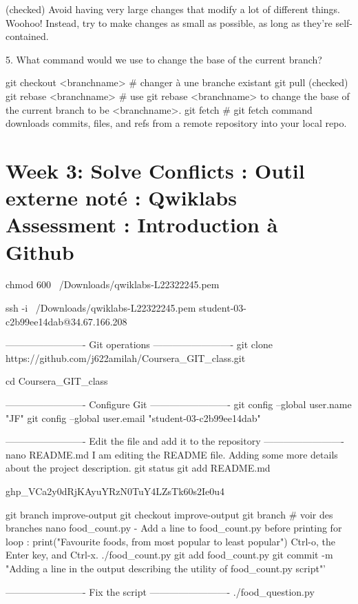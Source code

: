 \documentclass[11pt, onecolumn]{article}
\begin{document}
(checked) Avoid having very large changes that modify a lot of different things.
Woohoo! Instead, try to make changes as small as possible, as long as they’re self-contained.


5. What command would we use to change the base of the current branch?

git checkout <branchname>   # changer à une branche existant
git pull
(checked) git rebase <branchname>     # use git rebase <branchname> to change the base of the current branch to be <branchname>.
git fetch 		# git fetch command downloads commits, files, and refs from a remote repository into your local repo.




\section{Week 3: Solve Conflicts : Outil externe noté : Qwiklabs Assessment : Introduction à Github}


chmod 600 ~/Downloads/qwiklabs-L22322245.pem

ssh -i ~/Downloads/qwiklabs-L22322245.pem student-03-c2b99ee14dab@34.67.166.208

-------------------------
Git operations
-------------------------
git clone https://github.com/j622amilah/Coursera_GIT_class.git 


cd Coursera_GIT_class

-------------------------
Configure Git
-------------------------
git config --global user.name "JF"
git config --global user.email "student-03-c2b99ee14dab"

-------------------------
Edit the file and add it to the repository
-------------------------
nano README.md
I am editing the README file. Adding some more details about the project description.
git status
git add README.md

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


git branch improve-output
git checkout improve-output
git branch  # voir des branches
nano food_count.py
- Add a line to food_count.py before printing for loop : print("Favourite foods, from most popular to least popular")
Ctrl-o, the Enter key, and Ctrl-x.
./food_count.py
git add food_count.py
git commit -m "Adding a line in the output describing the utility of food_count.py script"'


-------------------------
Fix the script
-------------------------
./food_question.py
\end{document}
